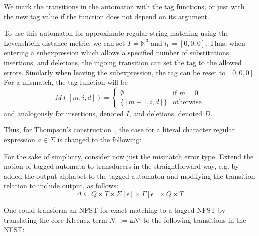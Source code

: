 We mark the transitions in the automaton with the tag functions, or just with
the new tag value if the function does not depend on its argument.

To use this automaton for approximate regular string matching using the
Levenshtein distance metric, we can set $T = \mathbb{N}^3$ and $t_0 =
[0,0,0]$. Thus, when entering a subexpression which allows a specified number
of substitutions, insertions, and deletions, the ingoing transition can set the
tag to the allowed errors. Similarly when leaving the subexpression, the tag
can be reset to $[0,0,0]$. For a mismatch, the tag function will be
\[
  M([m,i,d]) =
  \begin{cases}
    \emptyset     & \text{if } m = 0 \\
    \{[m-1,i,d]\} & \text{otherwise}
  \end{cases}
\]
and analogously for insertions, denoted $I$, and deletions, denoted $D$.

Thus, for Thompson's construction~\cite{thompson1968programming}, the case for
a literal character regular expression $a \in \Sigma$ is changed to the
following:

\begin{center}
\end{center}

For the sake of simplicity, consider now just the mismatch error type. Extend
the notion of tagged automata to transducers in the straightforward way,
e.g. by added the output alphabet to the tagged automaton and modifying the
transition relation to include output, as follows:
\[
  \Delta \subseteq Q \times T \times \Sigma[\epsilon] \times \Gamma[\epsilon]
  \times Q \times T
\]

One could transform an NFST for exact matching to a tagged NFST by translating
the core Kleenex term $N ::= \mathtt{a}N'$ to the following transitions in the
NFST:

\begin{center}
\end{center}

